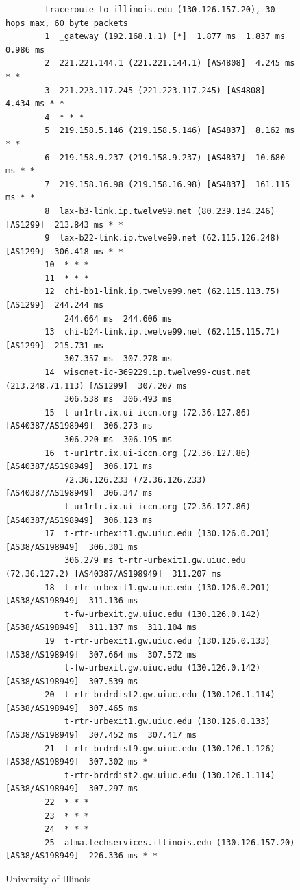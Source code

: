 \documentclass{cshwk}
\begin{document}
\begin{figure}[H]
    \footnotesize
    \begin{verbatim}
        traceroute to illinois.edu (130.126.157.20), 30 hops max, 60 byte packets
        1  _gateway (192.168.1.1) [*]  1.877 ms  1.837 ms  0.986 ms
        2  221.221.144.1 (221.221.144.1) [AS4808]  4.245 ms * *
        3  221.223.117.245 (221.223.117.245) [AS4808]  4.434 ms * *
        4  * * *
        5  219.158.5.146 (219.158.5.146) [AS4837]  8.162 ms * *
        6  219.158.9.237 (219.158.9.237) [AS4837]  10.680 ms * *
        7  219.158.16.98 (219.158.16.98) [AS4837]  161.115 ms * *
        8  lax-b3-link.ip.twelve99.net (80.239.134.246) [AS1299]  213.843 ms * *
        9  lax-b22-link.ip.twelve99.net (62.115.126.248) [AS1299]  306.418 ms * *
        10  * * *
        11  * * *
        12  chi-bb1-link.ip.twelve99.net (62.115.113.75) [AS1299]  244.244 ms 
            244.664 ms  244.606 ms
        13  chi-b24-link.ip.twelve99.net (62.115.115.71) [AS1299]  215.731 ms 
            307.357 ms  307.278 ms
        14  wiscnet-ic-369229.ip.twelve99-cust.net (213.248.71.113) [AS1299]  307.207 ms
            306.538 ms  306.493 ms
        15  t-ur1rtr.ix.ui-iccn.org (72.36.127.86) [AS40387/AS198949]  306.273 ms
            306.220 ms  306.195 ms
        16  t-ur1rtr.ix.ui-iccn.org (72.36.127.86) [AS40387/AS198949]  306.171 ms
            72.36.126.233 (72.36.126.233) [AS40387/AS198949]  306.347 ms
            t-ur1rtr.ix.ui-iccn.org (72.36.127.86) [AS40387/AS198949]  306.123 ms
        17  t-rtr-urbexit1.gw.uiuc.edu (130.126.0.201) [AS38/AS198949]  306.301 ms
            306.279 ms t-rtr-urbexit1.gw.uiuc.edu (72.36.127.2) [AS40387/AS198949]  311.207 ms
        18  t-rtr-urbexit1.gw.uiuc.edu (130.126.0.201) [AS38/AS198949]  311.136 ms 
            t-fw-urbexit.gw.uiuc.edu (130.126.0.142) [AS38/AS198949]  311.137 ms  311.104 ms
        19  t-rtr-urbexit1.gw.uiuc.edu (130.126.0.133) [AS38/AS198949]  307.664 ms  307.572 ms 
            t-fw-urbexit.gw.uiuc.edu (130.126.0.142) [AS38/AS198949]  307.539 ms
        20  t-rtr-brdrdist2.gw.uiuc.edu (130.126.1.114) [AS38/AS198949]  307.465 ms 
            t-rtr-urbexit1.gw.uiuc.edu (130.126.0.133) [AS38/AS198949]  307.452 ms  307.417 ms
        21  t-rtr-brdrdist9.gw.uiuc.edu (130.126.1.126) [AS38/AS198949]  307.302 ms * 
            t-rtr-brdrdist2.gw.uiuc.edu (130.126.1.114) [AS38/AS198949]  307.297 ms
        22  * * *
        23  * * *
        24  * * *
        25  alma.techservices.illinois.edu (130.126.157.20) [AS38/AS198949]  226.336 ms * *
    \end{verbatim}
    \caption{University of Illinois}
    \label{fig:traceroute-uiuc}
\end{figure}
\end{document}
